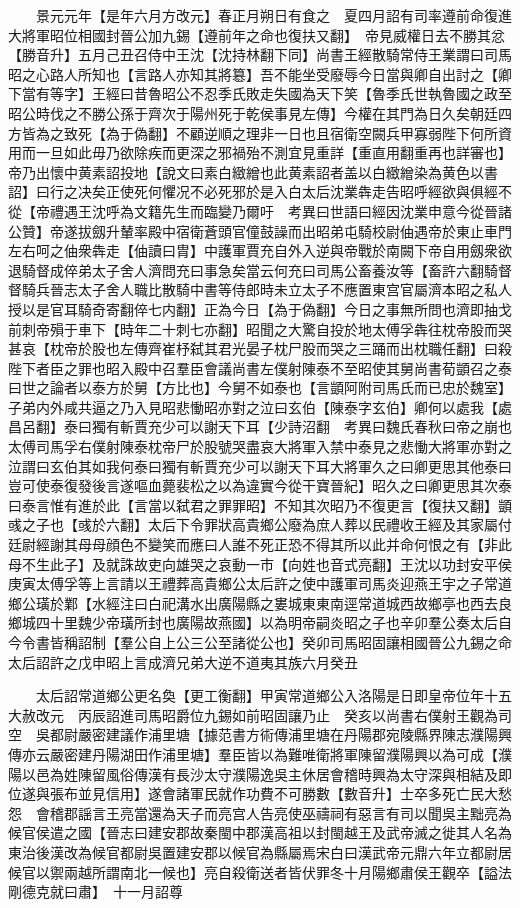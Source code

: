 　　景元元年【是年六月方改元】春正月朔日有食之　夏四月詔有司率遵前命復進大將軍昭位相國封晉公加九錫【遵前年之命也復扶又翻】　帝見威權日去不勝其忿【勝音升】五月己丑召侍中王沈【沈持林翻下同】尚書王經散騎常侍王業謂曰司馬昭之心路人所知也【言路人亦知其將簒】吾不能坐受廢辱今日當與卿自出討之【卿下當有等字】王經曰昔魯昭公不忍季氏敗走失國為天下笑【魯季氏世執魯國之政至昭公時伐之不勝公孫于齊次于陽州死于乾侯事見左傳】今權在其門為日久矣朝廷四方皆為之致死【為于偽翻】不顧逆順之理非一日也且宿衛空闕兵甲寡弱陛下何所資用而一旦如此毋乃欲除疾而更深之邪禍殆不測宜見重詳【重直用翻重再也詳審也】帝乃出懷中黄素詔投地【說文曰素白緻繒也此黄素詔者盖以白緻繒染為黄色以書詔】曰行之决矣正使死何懼况不必死邪於是入白太后沈業犇走告昭呼經欲與俱經不從【帝禮遇王沈呼為文籍先生而臨變乃爾吁　考異曰世語曰經因沈業申意今從晉諸公贊】帝遂拔劔升輦率殿中宿衛蒼頭官僮鼓譟而出昭弟屯騎校尉伷遇帝於東止車門左右呵之伷衆犇走【伷讀曰胄】中護軍賈充自外入逆與帝戰於南闕下帝自用劔衆欲退騎督成倅弟太子舍人濟問充曰事急矣當云何充曰司馬公畜養汝等【畜許六翻騎督督騎兵晉志太子舍人職比散騎中書等侍郎時未立太子不應置東宫官屬濟本昭之私人授以是官耳騎奇寄翻倅七内翻】正為今日【為于偽翻】今日之事無所問也濟即抽戈前刺帝殞于車下【時年二十刺七亦翻】昭聞之大驚自投於地太傅孚犇往枕帝股而哭甚哀【枕帝於股也左傳齊崔杼弑其君光晏子枕尸股而哭之三踊而出枕職任翻】曰殺陛下者臣之罪也昭入殿中召羣臣會議尚書左僕射陳泰不至昭使其舅尚書荀顗召之泰曰世之論者以泰方於舅【方比也】今舅不如泰也【言顗阿附司馬氏而已忠於魏室】子弟内外咸共逼之乃入見昭悲慟昭亦對之泣曰玄伯【陳泰字玄伯】卿何以處我【處昌呂翻】泰曰獨有斬賈充少可以謝天下耳【少詩沼翻　考異曰魏氏春秋曰帝之崩也太傅司馬孚右僕射陳泰枕帝尸於股號哭盡哀大將軍入禁中泰見之悲慟大將軍亦對之泣謂曰玄伯其如我何泰曰獨有斬賈充少可以謝天下耳大將軍久之曰卿更思其他泰曰豈可使泰復發後言遂嘔血薨裴松之以為違實今從干寶晉紀】昭久之曰卿更思其次泰曰泰言惟有進於此【言當以弑君之罪罪昭】不知其次昭乃不復更言【復扶又翻】顗彧之子也【彧於六翻】太后下令罪狀高貴鄉公廢為庶人葬以民禮收王經及其家屬付廷尉經謝其母母顔色不變笑而應曰人誰不死正恐不得其所以此并命何恨之有【非此母不生此子】及就誅故吏向雄哭之哀動一市【向姓也音式亮翻】王沈以功封安平侯庚寅太傅孚等上言請以王禮葬高貴鄉公太后許之使中護軍司馬炎迎燕王宇之子常道鄉公璜於鄴【水經注曰白祀溝水出廣陽縣之婁城東東南逕常道城西故鄉亭也西去良鄉城四十里魏少帝璜所封也廣陽故燕國】以為明帝嗣炎昭之子也辛卯羣公奏太后自今令書皆稱詔制【羣公自上公三公至諸從公也】癸卯司馬昭固讓相國晉公九錫之命太后詔許之戊申昭上言成濟兄弟大逆不道夷其族六月癸丑

　　太后詔常道鄉公更名奐【更工衡翻】甲寅常道鄉公入洛陽是日即皇帝位年十五大赦改元　丙辰詔進司馬昭爵位九錫如前昭固讓乃止　癸亥以尚書右僕射王觀為司空　吳都尉嚴密建議作浦里塘【據范書方術傳浦里塘在丹陽郡宛陵縣界陳志濮陽興傳亦云嚴密建丹陽湖田作浦里塘】羣臣皆以為難唯衛將軍陳留濮陽興以為可成【濮陽以邑為姓陳留風俗傳漢有長沙太守濮陽逸吳主休居會稽時興為太守深與相結及即位遂與張布並見信用】遂會諸軍民就作功費不可勝數【數音升】士卒多死亡民大愁怨　會稽郡謡言王亮當還為天子而亮宫人告亮使巫禱祠有惡言有司以聞吳主黜亮為候官侯遣之國【晉志曰建安郡故秦閩中郡漢高祖以封閩越王及武帝滅之徙其人名為東治後漢改為候官都尉吳置建安郡以候官為縣屬焉宋白曰漢武帝元鼎六年立都尉居候官以禦兩越所謂南北一候也】亮自殺衛送者皆伏罪冬十月陽鄉肅侯王觀卒【謚法剛德克就曰肅】　十一月詔尊

